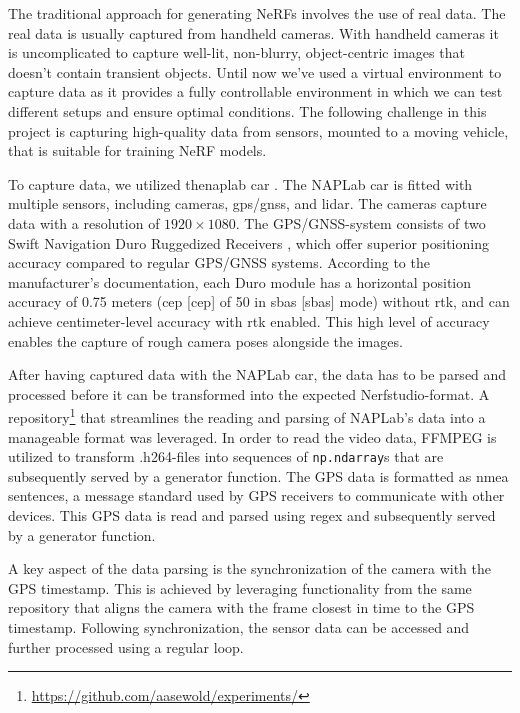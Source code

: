 The traditional approach for generating NeRFs involves the use of real data. The real data is usually captured from handheld cameras. With handheld cameras it is uncomplicated to capture well-lit, non-blurry, object-centric images that doesn't contain transient objects. Until now we've used a virtual environment to capture data as it provides a fully controllable environment in which we can test different setups and ensure optimal conditions. The following challenge in this project is capturing high-quality data from sensors, mounted to a moving vehicle, that is suitable for training NeRF models.

To capture data, we utilized the\acrshort{naplab} car \cite{naplab}. The NAPLab car is fitted with multiple sensors, including cameras, \acrshort{gps}/\acrshort{gnss}, and \acrshort{lidar}. The cameras capture data with a resolution of $1920 \times 1080$. The GPS/GNSS-system consists of two Swift Navigation Duro Ruggedized Receivers \cite{swift_navigation_duro_manual}, which offer superior positioning accuracy compared to regular GPS/GNSS systems. According to the manufacturer’s documentation, each Duro module has a horizontal position accuracy of 0.75 meters (\acrlong{cep} [\acrshort{cep}] of 50 in \acrlong{sbas} [\acrshort{sbas}] mode) without \acrfull{rtk}, and can achieve centimeter-level accuracy with \acrshort{rtk} enabled. This high level of accuracy enables the capture of rough camera poses alongside the images.

After having captured data with the NAPLab car, the data has to be parsed and processed before it can be transformed into the expected Nerfstudio-format. A repository\footnote{\url{https://github.com/aasewold/experiments/}} that streamlines the reading and parsing of NAPLab's data into a manageable format was leveraged. In order to read the video data, FFMPEG is utilized to transform .h264-files into sequences of \texttt{np.ndarray}s that are subsequently served by a generator function. The GPS data is formatted as \acrfull{nmea} sentences, a message standard used by GPS receivers to communicate with other devices. This GPS data is read and parsed using regex and subsequently served by a generator function. 

A key aspect of the data parsing is the synchronization of the camera with the GPS timestamp. This is achieved by leveraging functionality from the same repository that aligns the camera with the frame closest in time to the GPS timestamp. Following synchronization, the sensor data can be accessed and further processed using a regular loop.

